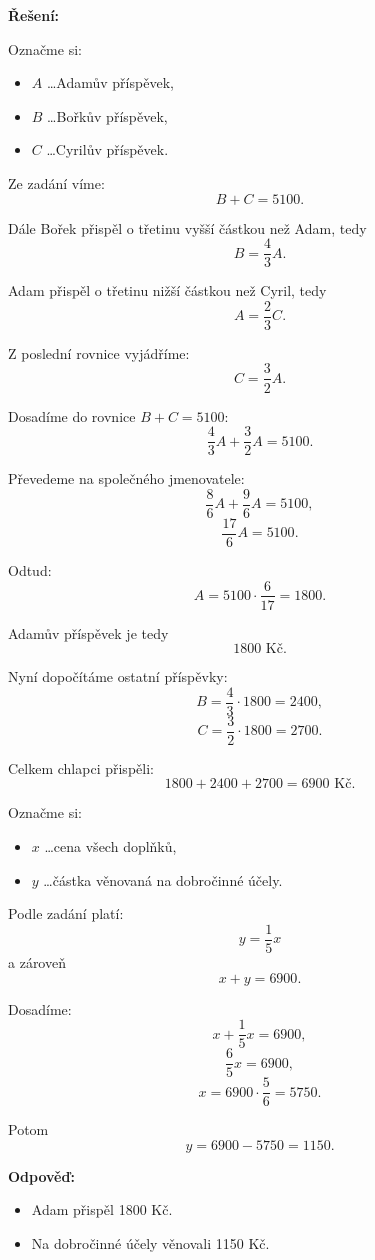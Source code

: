 \documentclass[12pt,a4paper]{article}
\begin{document}
\textbf{Řešení:}

Označme si:
\begin{itemize}
    \item \(A\) \dots Adamův příspěvek,
    \item \(B\) \dots Bořkův příspěvek,
    \item \(C\) \dots Cyrilův příspěvek.
\end{itemize}

Ze zadání víme:
\[
B+C=5100.
\]

Dále Bořek přispěl o třetinu vyšší částkou než Adam, tedy
\[
B=\frac{4}{3}A.
\]

Adam přispěl o třetinu nižší částkou než Cyril, tedy
\[
A=\frac{2}{3}C.
\]

Z poslední rovnice vyjádříme:
\[
C=\frac{3}{2}A.
\]

Dosadíme do rovnice \(B+C=5100\):
\[
\frac{4}{3}A+\frac{3}{2}A=5100.
\]

Převedeme na společného jmenovatele:
\[
\frac{8}{6}A+\frac{9}{6}A=5100,
\]
\[
\frac{17}{6}A=5100.
\]

Odtud:
\[
A=5100\cdot \frac{6}{17}=1800.
\]

Adamův příspěvek je tedy
\[
1800\text{ Kč}.
\]

\medskip

Nyní dopočítáme ostatní příspěvky:
\[
B=\frac{4}{3}\cdot 1800=2400,
\]
\[
C=\frac{3}{2}\cdot 1800=2700.
\]

Celkem chlapci přispěli:
\[
1800+2400+2700=6900\text{ Kč}.
\]

Označme si:
\begin{itemize}
    \item \(x\) \dots cena všech doplňků,
    \item \(y\) \dots částka věnovaná na dobročinné účely.
\end{itemize}

Podle zadání platí:
\[
y=\frac{1}{5}x
\]
a zároveň
\[
x+y=6900.
\]

Dosadíme:
\[
x+\frac{1}{5}x=6900,
\]
\[
\frac{6}{5}x=6900,
\]
\[
x=6900\cdot \frac{5}{6}=5750.
\]

Potom
\[
y=6900-5750=1150.
\]

\bigskip

\textbf{Odpověď:}
\begin{itemize}
    \item[14.1] Adam přispěl 1800 Kč.
    \item[14.2] Na dobročinné účely věnovali 1150 Kč.
\end{itemize}
\end{document}
